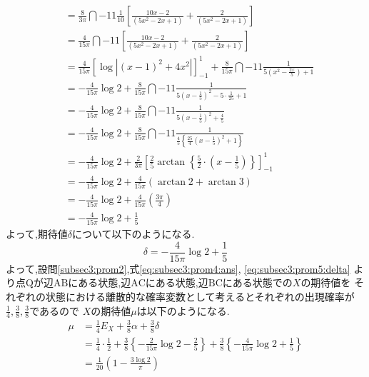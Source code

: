 \begin{enumerate}[(1)]
\begin{align*}
          &= \frac{8}{3\pi}\dint{-1}{1}{\frac{1}{10}\left[\frac{10x - 2}{(5x^2 - 2x + 1)} + \frac{2}{(5x^2 - 2x + 1)}\right]}\\
          &= \frac{4}{15\pi}\dint{-1}{1}{\left[\frac{10x - 2}{(5x^2 - 2x + 1)} + \frac{2}{(5x^2 - 2x + 1)}\right]}\\
          &= \frac{4}{15\pi}\left[\log |(x - 1)^2 + 4x^2|\right]_{-1}^{1} + \frac{8}{15\pi}\dint{-1}{1}{\frac{1}{5(x^2 - \frac{2x}{5}) + 1}}\\
          &= -\frac{4}{15\pi}\log 2 + \frac{8}{15\pi}\dint{-1}{1}{\frac{1}{5(x - \frac{1}{5})^2 - 5\cdot \frac{1}{25} + 1}}\\
          &= -\frac{4}{15\pi}\log 2 + \frac{8}{15\pi}\dint{-1}{1}{\frac{1}{5(x - \frac{1}{5})^2 + \frac{4}{5}}}\\
          &= -\frac{4}{15\pi}\log 2 + \frac{8}{15\pi}\dint{-1}{1}{\frac{1}{\frac{4}{5}\left\{\frac{25}{4}(x - \frac{1}{5})^2 + 1\right\}}}\\
          &= -\frac{4}{15\pi}\log 2 + \frac{2}{3\pi}\left[\frac{2}{5}\arctan \left\{\frac{5}{2}\cdot \left(x - \frac{1}{5}\right)\right\}\right]_{-1}^{1}\\
          &= -\frac{4}{15\pi}\log 2 + \frac{4}{15\pi}(\arctan 2 + \arctan 3)\\
          &= -\frac{4}{15\pi}\log 2 + \frac{4}{15\pi}\left(\frac{3\pi}{4}\right)\\
          &= -\frac{4}{15\pi}\log 2 + \frac{1}{5}
  \end{align*}
  よって,期待値$\delta$について以下のようになる.
  \begin{equation}
    \delta = -\frac{4}{15\pi}\log 2 + \frac{1}{5}\label{eq:subsec3:prom5:delta}
  \end{equation}
  よって,設問\eqref{subsec3:prom2},式\eqref{eq:subsec3:prom4:ans}, \eqref{eq:subsec3:prom5:delta}
  より点$\mathrm{Q}$が辺$\mathrm{AB}$にある状態,辺$\mathrm{AC}$にある状態,辺$\mathrm{BC}$にある状態での$X$の期待値を
  それぞれの状態における離散的な確率変数として考えるとそれぞれの出現確率が$\frac{1}{4}, \frac{3}{8}, \frac{3}{8}$であるので
  $X$の期待値$\mu$は以下のようになる.
  \begin{align*}
    \mu &= \frac{1}{4}E_{X} + \frac{3}{8}\alpha + \frac{3}{8}\delta\\
        &= \frac{1}{4}\cdot\frac{1}{2} 
          + \frac{3}{8}\left\{-\frac{2}{15\pi}\log 2-\frac{2}{5}\right\}
          + \frac{3}{8}\left\{-\frac{4}{15\pi}\log 2 + \frac{1}{5}\right\}\\
        &= \frac{1}{20}\left(1 - \frac{3\log 2}{\pi}\right)
  \end{align*}
\end{enumerate}